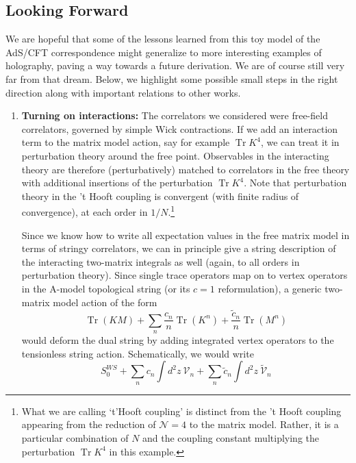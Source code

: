 \documentclass[english]{article}
\DeclareMathOperator{\Tr}{Tr}
\renewcommand{\>}{\rangle}
\newcommand{\<}{\langle}
\renewcommand{\(}{\left(}
\renewcommand{\)}{\right)}
\begin{document}
\subsection{Looking Forward} \label{sec:lookingforward}
 We are hopeful that some of the lessons learned from this toy model of the AdS/CFT correspondence might generalize to more interesting examples of holography, paving a way towards a future derivation. We are of course still very far from that dream. Below, we highlight some possible small steps in the right direction along with important relations to other works.

\begin{enumerate}
\item \textbf{Turning on interactions: } The correlators we considered were free-field correlators, governed by simple Wick contractions. If we add an interaction term to the matrix model action, say for example $\Tr K^4$, we can treat it in perturbation theory around the free point. Observables in the interacting theory are therefore (perturbatively) matched to correlators in the free theory with additional insertions of the perturbation  $\Tr K^4$. 
Note that perturbation theory in the 't Hooft coupling is convergent (with finite radius of convergence), at each order in $1/N$.\footnote{What we are calling `t'Hooft coupling' is distinct from the 't Hooft coupling appearing from the reduction of $\mathcal{N}=4$ to the matrix model. Rather, it is a particular combination of $N$ and the coupling constant multiplying the perturbation $\Tr K^4$ in this example.} 

Since we know how to write all expectation values in the free matrix model in terms of stringy correlators, we can in principle give a string description of the interacting two-matrix integrals as well (again, to all orders in perturbation theory). Since single trace operators map on to vertex operators in the A-model topological string (or its $c=1$ reformulation), a generic two-matrix model action of the form 
\begin{equation} \label{eq:defmatrixaction}
    \Tr(KM) +\sum_{n} \frac{c_{n}}{n} \Tr(K^{n}) + \frac{\tilde{c}_{n}}{n} \Tr(M^{n})
\end{equation}
would deform the dual string by adding integrated vertex operators to the tensionless string action. Schematically, we would write
\begin{equation}
    S_{0}^{WS} +\sum_{n} c_{n} \int d^2z \  \mathcal{V}_{n} + \sum_{n}  \tilde{c}_{n} \int d^2 z \ \tilde{\mathcal{V}}_{n} \label{eq:defstringaction}
\end{equation}



\end{enumerate}
\end{document}
